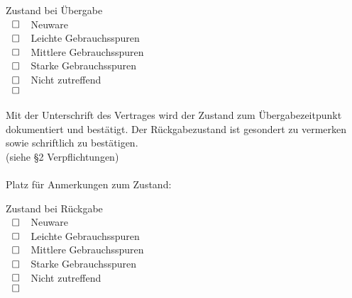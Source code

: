 \documentclass[article, 11pt,a4paper, titlepage, parskip=half, bibliography=totocnumbered]{scrreprt}
\begin{document}
\begin{contract}
		\begin{multicols}{2}
				Zustand bei Übergabe \\
				$\makebox[20pt][L]{$\square$}\raisebox{.15ex}{\hspace{0.1em}}$ Neuware \\
				$\makebox[20pt][L]{$\square$}\raisebox{.15ex}{\hspace{0.1em}}$ Leichte Gebrauchsspuren \\
				$\makebox[20pt][L]{$\square$}\raisebox{.15ex}{\hspace{0.1em}}$ Mittlere Gebrauchsspuren \\
				$\makebox[20pt][L]{$\square$}\raisebox{.15ex}{\hspace{0.1em}}$ Starke Gebrauchsspuren \\
				$\makebox[20pt][L]{$\square$}\raisebox{.15ex}{\hspace{0.1em}}$ Nicht zutreffend \\
				$\makebox[20pt][L]{$\square$}\raisebox{.15ex}{\hspace{0.1em}}$ \\
			
				~ \\
				Mit der Unterschrift des Vertrages wird der Zustand zum Übergabezeitpunkt dokumentiert und bestätigt. Der Rückgabezustand ist gesondert zu vermerken sowie schriftlich zu bestätigen. \\
				(siehe §2 Verpflichtungen) \\ \\
				Platz für Anmerkungen zum Zustand: \\
				
			
			\columnbreak
				Zustand bei Rückgabe \\
				$\makebox[20pt][L]{$\square$}\raisebox{.15ex}{\hspace{0.1em}}$ Neuware \\
				$\makebox[20pt][L]{$\square$}\raisebox{.15ex}{\hspace{0.1em}}$ Leichte Gebrauchsspuren \\
				$\makebox[20pt][L]{$\square$}\raisebox{.15ex}{\hspace{0.1em}}$ Mittlere Gebrauchsspuren \\
				$\makebox[20pt][L]{$\square$}\raisebox{.15ex}{\hspace{0.1em}}$ Starke Gebrauchsspuren \\
				$\makebox[20pt][L]{$\square$}\raisebox{.15ex}{\hspace{0.1em}}$ Nicht zutreffend \\
				$\makebox[20pt][L]{$\square$}\raisebox{.15ex}{\hspace{0.1em}}$ \\
				

\end{multicols}
\end{contract}
\end{document}
